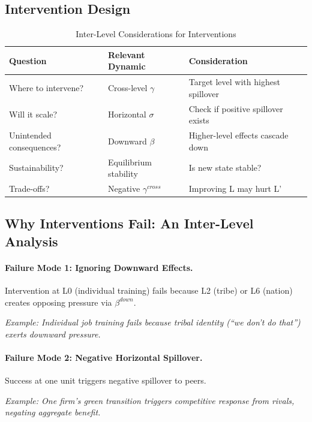 \subsection{Intervention Design}

\begin{table}[htbp]
\centering
\caption{Inter-Level Considerations for Interventions}
\label{tab:aaa-intervention-implications}
\renewcommand{\arraystretch}{1.3}
\begin{tabular}{@{}lll@{}}
\toprule
\textbf{Question} & \textbf{Relevant Dynamic} & \textbf{Consideration} \\
\midrule
Where to intervene? & Cross-level $\gamma$ & Target level with highest spillover \\
Will it scale? & Horizontal $\sigma$ & Check if positive spillover exists \\
Unintended consequences? & Downward $\beta$ & Higher-level effects cascade down \\
Sustainability? & Equilibrium stability & Is new state stable? \\
Trade-offs? & Negative $\gamma^{cross}$ & Improving L may hurt L' \\
\bottomrule
\end{tabular}
\end{table}

\subsection{Why Interventions Fail: An Inter-Level Analysis}

\paragraph{Failure Mode 1: Ignoring Downward Effects.}
Intervention at L0 (individual training) fails because L2 (tribe) or L6 (nation)
creates opposing pressure via $\beta^{down}$.

\textit{Example: Individual job training fails because tribal identity (``we don't do that'')
exerts downward pressure.}

\paragraph{Failure Mode 2: Negative Horizontal Spillover.}
Success at one unit triggers negative spillover to peers.

\textit{Example: One firm's green transition triggers competitive response from rivals,
negating aggregate benefit.}


